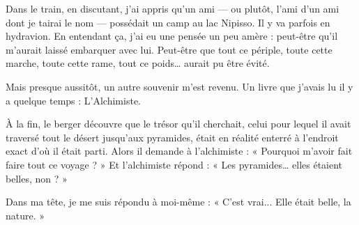 Dans le train, en discutant, j’ai appris qu’un ami — ou plutôt, l’ami d’un ami dont je tairai le nom — possédait un camp au lac Nipisso. Il y va parfois en hydravion. En entendant ça, j’ai eu une pensée un peu amère : peut-être qu’il m’aurait laissé embarquer avec lui. Peut-être que tout ce périple, toute cette marche, toute cette rame, tout ce poids… aurait pu être évité.

Mais presque aussitôt, un autre souvenir m’est revenu. Un livre que j’avais lu il y a quelque temps : L’Alchimiste.

À la fin, le berger découvre que le trésor qu’il cherchait, celui pour lequel il avait traversé tout le désert jusqu’aux pyramides, était en réalité enterré à l’endroit exact d’où il était parti. Alors il demande à l’alchimiste :
« Pourquoi m’avoir fait faire tout ce voyage ? »
Et l’alchimiste répond :
« Les pyramides… elles étaient belles, non ? »

Dans ma tête, je me suis répondu à moi-même :
« C’est vrai... Elle était belle, la nature. »